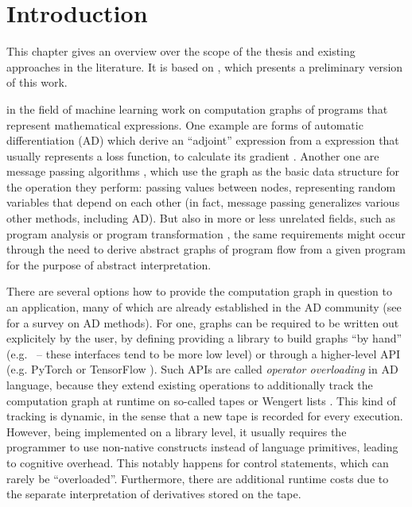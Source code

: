 \chapter{Introduction}
\label{cha:introduction}

This chapter gives an overview over the scope of the thesis and existing approaches in the
literature.  It is based on \textcite{gabler2019graph}, which presents a preliminary version of this
work.

 in the field of machine learning work on computation graphs of programs
that represent mathematical expressions.  One example are forms of automatic differentiation (AD)
which derive an \enquote{adjoint} expression from a expression that usually represents a loss
function, to calculate its gradient \parencite{griewank2008evaluating, gebremedhin2020introduction}.
Another one are message passing algorithms \parencite{minka2005divergence}, which use the graph as
the basic data structure for the operation they perform: passing values between nodes, representing
random variables that depend on each other (in fact, message passing generalizes various other
methods, including AD).  But also in more or less unrelated fields, such as program analysis or
program transformation \parencite[cf.][]{muchnick1997advanced,singer2018static,aho1986compilers},
the same requirements might occur through the need to derive abstract graphs of program flow from a
given program for the purpose of abstract interpretation.

There are several options how to provide the computation graph in question to an application, many
of which are already established in the AD community (see \textcite{baydin2018automatic} for a
survey on AD methods).  For one, graphs can be required to be written out explicitely by the user,
by defining providing a library to build graphs \enquote{by hand}
(e.g. \textcite{chewxy2020gorgonia,jia2014caffe}~-- these interfaces tend to be more low level) or
through a higher-level API (e.g. PyTorch \parencite{paszke2017automatic} or TensorFlow
\parencite{abadi2015tensorflow}).  Such APIs are called \emph{operator overloading} in AD language,
because they extend existing operations to additionally track the computation graph at runtime on
so-called tapes or Wengert lists \parencite{bartholomew-biggs2000automatic}.  This kind of tracking
is dynamic, in the sense that a new tape is recorded for every execution.  However, being
implemented on a library level, it usually requires the programmer to use non-native constructs
instead of language primitives, leading to cognitive overhead.  This notably happens for control
statements, which can rarely be \enquote{overloaded}.  Furthermore, there are additional runtime
costs due to the separate interpretation of derivatives stored on the tape.

